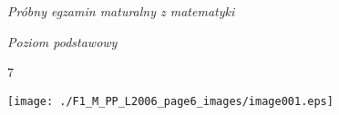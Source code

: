 \documentclass[a4paper,12pt]{article}
\begin{document}
{\it Próbny egzamin maturalny z matematyki}

{\it Poziom podstawowy}

7
\begin{center}
\texttt{[image: ./F1\_M\_PP\_L2006\_page6\_images/image001.eps]}
\end{center}
\end{document}
